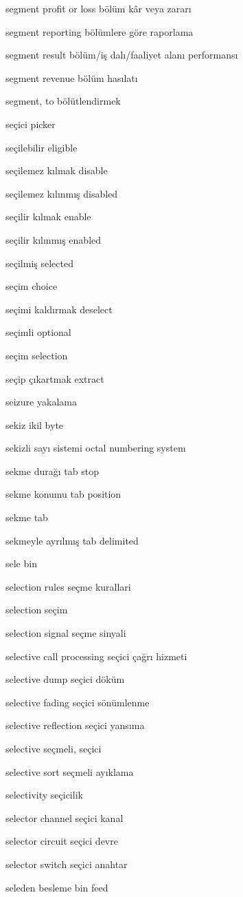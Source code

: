 \documentclass[12pt,fleqn]{article}\usepackage{../../common}
\begin{document}
segment profit or loss bölüm kâr veya zararı

segment reporting bölümlere göre raporlama

segment result bölüm/iş dalı/faaliyet alanı performansı

segment revenue bölüm hasılatı

segment, to bölütlendirmek

seçici picker

seçilebilir eligible

seçilemez kılmak disable

seçilemez kılınmış disabled

seçilir kılmak enable

seçilir kılınmış enabled

seçilmiş selected

seçim choice

seçimi kaldırmak deselect

seçimli optional

seçim selection

seçip çıkartmak extract

seizure yakalama

sekiz ikil byte

sekizli sayı sistemi octal numbering system

sekme durağı tab stop

sekme konumu tab position

sekme tab

sekmeyle ayrılmış tab delimited

sele bin

selection rules seçme kurallari

selection seçim

selection signal seçme sinyali

selective call processing seçici çağrı hizmeti

selective dump seçici döküm

selective fading seçici sönümlenme

selective reflection seçici yansıma

selective seçmeli, seçici

selective sort seçmeli ayıklama

selectivity seçicilik

selector channel seçici kanal

selector circuit seçici devre

selector switch seçici anahtar

seleden besleme bin feed
\end{document}
